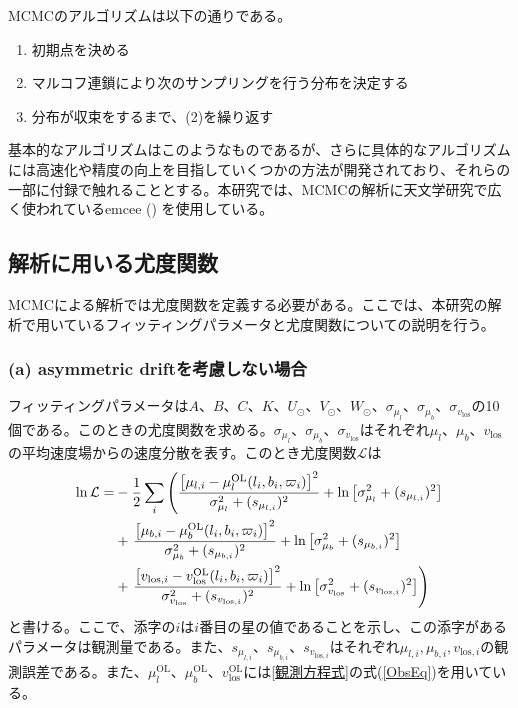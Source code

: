 MCMCのアルゴリズムは以下の通りである。
\begin{enumerate}
	\item{初期点を決める}
	\item{マルコフ連鎖により次のサンプリングを行う分布を決定する}
	\item{分布が収束をするまで、(2)を繰り返す}
\end{enumerate}
基本的なアルゴリズムはこのようなものであるが、さらに具体的なアルゴリズムには高速化や精度の向上を目指していくつかの方法が開発されており、それらの一部に付録で触れることとする。本研究では、MCMCの解析に天文学研究で広く使われているemcee (\cite{Foreman2013}) を使用している。



\subsection{解析に用いる尤度関数 \label{解析に用いる尤度関数}}
MCMCによる解析では尤度関数を定義する必要がある。ここでは、本研究の解析で用いているフィッティングパラメータと尤度関数についての説明を行う。

\subsubsection{(a) asymmetric driftを考慮しない場合}
フィッティングパラメータは$A、B、C、K、U_{\odot}、V_{\odot}、W_{\odot}、\sigma_{\mu_l}、\sigma_{\mu_b}、\sigma_{v_{\mathrm{los}}}$の10個である。このときの尤度関数を求める。$\sigma_{\mu_l}、\sigma_{\mu_b}、\sigma_{v_{\mathrm{los}}}$はそれぞれ$\mu_l、\mu_b、v_{\mathrm{los}}$の平均速度場からの速度分散を表す。このとき尤度関数$\mathcal{L}$は
\begin{align}
\begin{aligned}
	\ln \mathcal{L} =& -\frac{1}{2}\sum_i \left(\frac{\left[\mu_{l,i} - \mu_l^{\mathrm{OL}}(l_i,b_i,\varpi_i)\right]^2}{\sigma_{\mu_l}^2 + (s_{\mu_{l,i}})^2}  + {\rm ln}\left[\sigma_{\mu_l}^2 + (s_{\mu_{l,i}})^2\right] \right. \\
	&+ \left. \frac{\left[\mu_{b,i} - \mu_b^{\mathrm{OL}}(l_i,b_i,\varpi_i)\right]^2}{\sigma_{\mu_b}^2 + (s_{\mu_{b,i}})^2}  + {\rm ln}\left[\sigma_{\mu_b}^2 + (s_{\mu_{b,i}})^2\right] \right. \\
	&+ \left. \frac{\left[v_{\mathrm{los},i} - v^{\mathrm{OL}}_{\mathrm{los}}(l_i,b_i,\varpi_i)\right]^2}{\sigma_{v_{\mathrm{los}}}^2 + (s_{v_{\mathrm{los},i}})^2} + {\rm ln}\left[\sigma_{v_{\mathrm{los}}}^2 + (s_{v_{\mathrm{los},i}})^2\right] \right)
\end{aligned} \label{Likelihood_Mock}
\end{align}
と書ける。ここで、添字の$i$は$i$番目の星の値であることを示し、この添字があるパラメータは観測量である。また、$s_{\mu_{l,i}}、s_{\mu_{b,i}}、s_{v_{\mathrm{los},i}}$はそれぞれ$\mu_{l,i},\mu_{b,i},v_{\mathrm{los},i}$の観測誤差である。また、$\mu_l^{\mathrm{OL}}、\mu_b^{\mathrm{OL}}、v^{\mathrm{OL}}_{\mathrm{los}}$には\ref{観測方程式}の式(\ref{ObsEq})を用いている。

